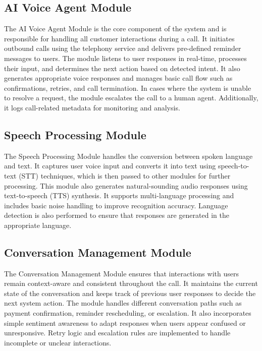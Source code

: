 \documentclass[12pt,a4paper]{report}
\begin{document}
\subsection{AI Voice Agent Module}

The AI Voice Agent Module is the core component of the system and is responsible for handling all customer interactions during a call. It initiates outbound calls using the telephony service and delivers pre-defined reminder messages to users. The module listens to user responses in real-time, processes their input, and determines the next action based on detected intent. It also generates appropriate voice responses and manages basic call flow such as confirmations, retries, and call termination. In cases where the system is unable to resolve a request, the module escalates the call to a human agent. Additionally, it logs call-related metadata for monitoring and analysis.

\subsection{Speech Processing Module}

The Speech Processing Module handles the conversion between spoken language and text. It captures user voice input and converts it into text using speech-to-text (STT) techniques, which is then passed to other modules for further processing. This module also generates natural-sounding audio responses using text-to-speech (TTS) synthesis. It supports multi-language processing and includes basic noise handling to improve recognition accuracy. Language detection is also performed to ensure that responses are generated in the appropriate language.

\subsection{Conversation Management Module}

The Conversation Management Module ensures that interactions with users remain context-aware and consistent throughout the call. It maintains the current state of the conversation and keeps track of previous user responses to decide the next system action. The module handles different conversation paths such as payment confirmation, reminder rescheduling, or escalation. It also incorporates simple sentiment awareness to adapt responses when users appear confused or unresponsive. Retry logic and escalation rules are implemented to handle incomplete or unclear interactions.
\end{document}
